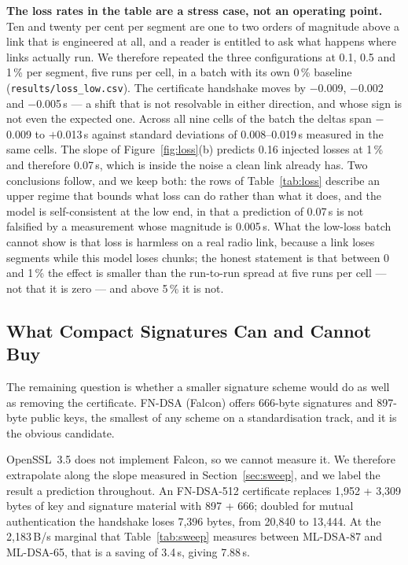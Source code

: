 \documentclass[drones,article,submit,pdftex,moreauthors]{Definitions/mdpi}
\newcommand{\mldsa}{ML-DSA}
\newcommand{\fndsa}{FN-DSA}
\begin{document}
\textbf{The loss rates in the table are a stress case, not an operating
point.} Ten and twenty per cent per segment are one to two orders of
magnitude above a link that is engineered at all, and a reader is
entitled to ask what happens where links actually run. We therefore
repeated the three configurations at 0.1, 0.5 and 1\,\% per segment,
five runs per cell, in a batch with its own 0\,\% baseline
(\texttt{results/loss\_low.csv}). The certificate handshake moves by
$-$0.009, $-$0.002 and $-$0.005\,s --- a shift that is not resolvable in
either direction, and whose sign is not even the expected one. Across
all nine cells of the batch the deltas span $-$0.009 to $+$0.013\,s
against standard deviations of 0.008--0.019\,s measured in the same
cells. The slope of Figure~\ref{fig:loss}(b) predicts 0.16 injected
losses at 1\,\% and therefore 0.07\,s, which is inside the noise a clean
link already has. Two conclusions follow, and we keep both: the rows of
Table~\ref{tab:loss} describe an upper regime that bounds what loss can
do rather than what it does, and the model is self-consistent at the low
end, in that a prediction of 0.07\,s is not falsified by a measurement
whose magnitude is 0.005\,s. What the low-loss batch cannot
show is that loss is harmless on a real radio link, because a link
loses segments while this model loses chunks; the honest statement is
that between 0 and 1\,\% the effect is smaller than the run-to-run
spread at five runs per cell --- not that it is zero --- and above
5\,\% it is not.

\subsection{What Compact Signatures Can and Cannot Buy}
\label{sec:compact}

The remaining question is whether a smaller signature scheme would do
as well as removing the certificate. \fndsa{} (Falcon) offers 666-byte
signatures and 897-byte public keys, the smallest of any scheme on a
standardisation track, and it is the obvious candidate.

OpenSSL~3.5 does not implement Falcon, so we cannot measure it. We
therefore extrapolate along the slope measured in
Section~\ref{sec:sweep}, and we label the result a prediction
throughout. An \fndsa{}-512 certificate replaces 1{,}952 + 3{,}309 bytes
of key and signature material with 897 + 666; doubled for mutual
authentication the handshake loses 7{,}396 bytes, from 20{,}840 to
13{,}444. At the 2{,}183\,B/s marginal that Table~\ref{tab:sweep}
measures between \mldsa{}-87 and \mldsa{}-65, that is a saving of
3.4\,s, giving 7.88\,s.
\end{document}
